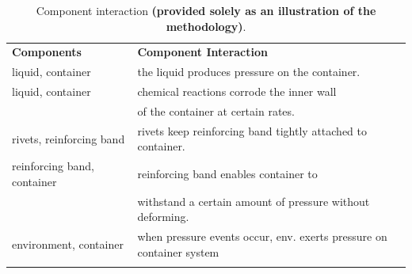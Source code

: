 \begin{table}
\begin{center}
    \begin{tabular}{l l}\Xhline{2\arrayrulewidth}
    \textbf{Components} & \textbf{Component Interaction} \\\Xhline{2\arrayrulewidth}
    liquid, container & the liquid produces pressure on the container.                                                                          \\
    liquid, container & chemical reactions corrode the inner wall  \\ & \qquad of the container at certain rates.                                                              \\
        rivets, reinforcing band & rivets keep reinforcing band tightly attached to container.   \\
        reinforcing band, container & reinforcing band enables container to \\ & \qquad withstand a certain amount of pressure without deforming.   \\ 
        environment, container & when pressure events occur, env. exerts pressure on container system \\ \Xhline{2\arrayrulewidth}
    \end{tabular}
    \small\caption{Component interaction \textbf{(provided solely as an illustration of the methodology)}.}\label{table:system_interactions}\normalsize
\end{center}
\end{table}



